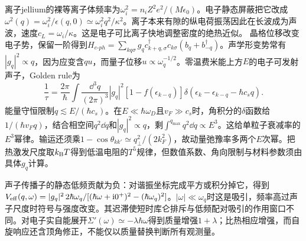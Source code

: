 离子jellium的裸等离子体频率为$\omega_i^2=n_iZ^2e^2/(M\epsilon_0)$。电子静态屏蔽把它改成$\omega^2(q)=\omega_i^2/\epsilon(q,0)\simeq\omega_i^2q^2/\kappa^2$。离子本来有隙的纵电荷振荡因此在长波成为声波，速度$c_L=\omega_i/\kappa$。这是电子可比离子快地调整密度的绝热近似。
晶格位移改变电子势，保留一阶得到$H_{e\text{-}ph}=\sum_{kq\sigma}g_qc_{k+q,\sigma}^\dagger c_{k\sigma}(b_q+b_{-q}^\dagger)$。声学形变势常有$|g_q|^2\propto q$，因为应变含$qu$，而量子位移$u\propto\omega_q^{-1/2}$。零温费米能上方$E$的电子可发射声子，Golden rule为
\begin{equation}
\frac1\tau=\frac{2\pi}{\hbar}\int\frac{\dd^3q}{(2\pi)^3}|g_q|^2[1-f(\epsilon_{k-q})]\delta(\epsilon_k-\epsilon_{k-q}-\hbar c_sq).
\end{equation}
能量守恒限制$q\lesssim E/(\hbar c_s)$。在$E\ll\hbar\omega_D$且$v_F\gg c_s$时，角积分的$\delta$函数给$1/(\hbar v_Fq)$，结合相空间$q^2\dd q$和$|g_q|^2\propto q$，剩$\int^{q_{\max}}q^2\dd q\propto E^3$。这给单粒子衰减率的$E^3$幂律。输运还须乘$1-\cos\theta_{kk'}\simeq q_\perp^2/(2k_F^2)$，故动量弛豫率多两个$E$次幂。把热激发尺度取$k_{\mathrm B} T$得到低温电阻的$T^5$规律，但数值系数、角向限制与材料参数须由具体$g_q$计算。

声子传播子的静态低频贡献为负：对谐振坐标完成平方或积分掉它，得到$V_{\rm eff}(q,\omega)=|g_q|^2\,2\hbar\omega_q/[(\hbar\omega+\mathrm i0^+)^2-(\hbar\omega_q)^2]$。$|\omega|\ll\omega_q$时这是吸引，频率高过声子尺度时符号与强度改变。其迟滞使短时库仑排斥与低频配对吸引的作用窗口不同。对电子实自能展开$\Sigma'(\omega)\simeq-\lambda\hbar\omega$得到质量增强$1+\lambda$；比热相应增强，而自旋响应还含顶角修正，不能仅以质量替换判断所有观测量。
